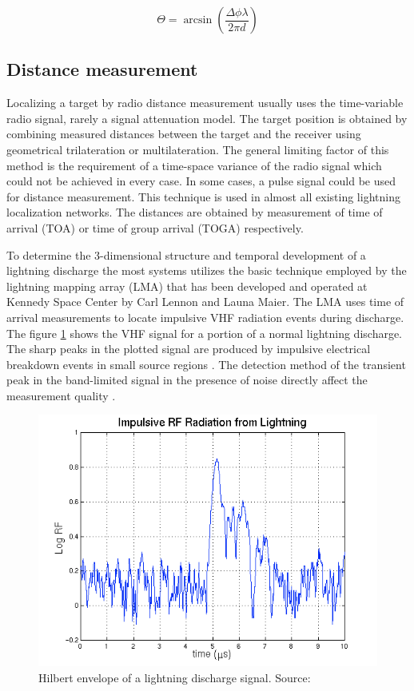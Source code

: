 \documentclass[twoside]{ctuthesis}
\theoremstyle{plain}
\theoremstyle{definition}
\theoremstyle{note}
\begin{document}
\begin{equation}
 \Theta = \arcsin \left( \frac{\Delta \phi \lambda}{2 \pi  d} \right)
 \label{AOA_Angle}
\end{equation}

\subsection{Distance measurement}
Localizing a target by radio distance measurement usually uses the time-variable radio signal, rarely a signal attenuation model.  The target position is obtained by combining measured distances between the target and the receiver using geometrical trilateration or multilateration. The general limiting factor of this method is the requirement of a time-space variance of the radio signal which could not be achieved in every case. 
In some cases, a pulse signal could be used for distance measurement. This technique is used in almost all existing lightning localization networks. The distances are obtained by measurement of time of arrival (TOA) or time of group arrival (TOGA) respectively.

To determine the 3-dimensional structure and temporal development of a lightning discharge the most systems utilizes the basic technique employed by the lightning mapping array (LMA) that has been developed and operated at Kennedy Space Center by Carl Lennon and Launa Maier. The LMA uses time of arrival measurements to locate impulsive VHF radiation events during discharge. The figure \ref{fig:lihting_discharge} shows the VHF signal for a portion of a normal lightning discharge. The sharp peaks in the plotted signal are produced by impulsive electrical breakdown events in small source regions \cite{NMLMA}. The detection method of the transient peak in the band-limited signal in the presence of noise directly affect the measurement quality \cite{Transient_peak}. 

\begin{figure}
 \begin{center}
 \includegraphics[width=\linewidth]{./img/lightning_waveform.png}
 \caption{Hilbert envelope of a lightning discharge signal. Source: \cite{NMLMA} }
  \label{fig:lihting_discharge} 
 \end{center}
\end{figure}
\end{document}
